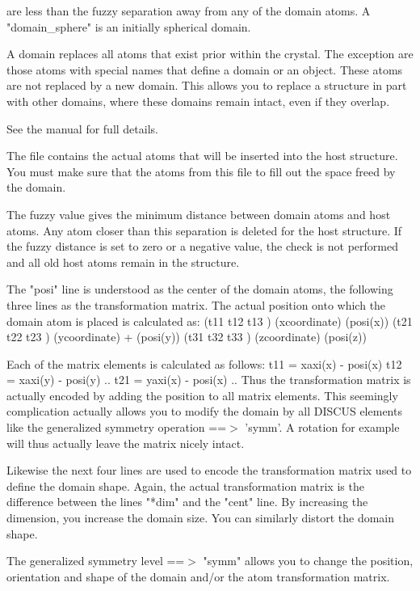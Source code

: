 are less than the fuzzy separation away from any of the domain atoms. 
A "domain\_sphere" is an initially spherical domain. 
\par
A domain replaces all atoms that exist prior within the crystal. 
The exception are those atoms with special names that define a 
domain or an object. These atoms are not replaced by a new domain. 
This allows you to replace a structure in part with other domains, 
where these domains remain intact, even if they overlap. 
\par
\par
See the manual for full details. 
\par
The file contains the actual atoms that will be inserted into the 
host structure. You must make sure that the atoms from this file to 
fill out the space freed by the domain. 
\par
The fuzzy value gives the minimum distance between domain atoms and 
host atoms. Any atom closer than this separation is deleted for the 
host structure. 
If the fuzzy distance is set to zero or a negative value, the check 
is not performed and all old host atoms remain in the structure. 
\par
The "posi" line is understood as the center of the domain atoms, 
the following three lines as the transformation matrix. The actual 
position onto which the domain atom is placed is calculated as: 
(t11  t12  t13 ) (xcoordinate)   (posi(x)) 
(t21  t22  t23 ) (ycoordinate) + (posi(y)) 
(t31  t32  t33 ) (zcoordinate)   (posi(z)) 
\par
Each of the matrix elements is calculated as follows: 
t11 = xaxi(x) - posi(x) 
t12 = xaxi(y) - posi(y) 
.. 
t21 = yaxi(x) - posi(x) 
.. 
Thus the transformation matrix is actually encoded by adding the 
position to all matrix elements. This seemingly complication actually 
allows you to modify the domain by all DISCUS elements like the 
generalized symmetry operation ==$> $ 'symm'. A rotation for example will 
thus actually leave the matrix nicely intact. 
\par
Likewise the next four lines are used to encode the transformation 
matrix used to define the domain shape. Again, the actual transformation 
matrix is the difference between the lines "*dim" and the "cent" line. 
By increasing the dimension, you increase the domain size. You can 
similarly distort the domain shape. 
\par
The generalized symmetry level ==$> $ "symm" allows you to change the 
position, orientation and shape of the domain and/or the atom transformation 
matrix. 
